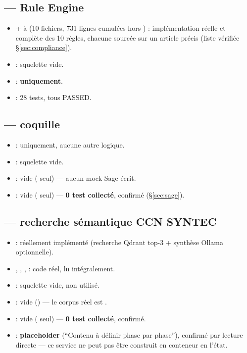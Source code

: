 \documentclass[11pt,a4paper]{article}
\begin{document}
\subsection*{ --- Rule Engine}
\begin{itemize}[leftmargin=1.3em]
\item {} +  \`a  (10 fichiers, 731 lignes cumul\'ees hors ) : impl\'ementation r\'eelle et compl\`ete des 10 r\`egles, chacune sourc\'ee sur un article pr\'ecis (liste v\'erifi\'ee \S\ref{sec:compliance}).
\item {} : squelette vide.
\item {} : \textbf{ uniquement}.
\item {} : 28 tests, tous PASSED.
\end{itemize}

\subsection*{ --- coquille}
\begin{itemize}[leftmargin=1.3em]
\item {} :  uniquement, aucune autre logique.
\item {} : squelette vide.
\item {} : vide ( seul) --- aucun mock Sage \'ecrit.
\item {} : vide ( seul) --- \textbf{0 test collect\'e}, confirm\'e (\S\ref{sec:sage}).
\end{itemize}

\subsection*{ --- recherche s\'emantique CCN SYNTEC}
\begin{itemize}[leftmargin=1.3em]
\item {} :  r\'eellement impl\'ement\'e (recherche Qdrant top-3 + synth\`ese Ollama optionnelle).
\item {}, , ,  : code r\'eel, lu int\'egralement.
\item {} : squelette vide, non utilis\'e.
\item {} : vide () --- le corpus r\'eel est .
\item {} : vide ( seul) --- \textbf{0 test collect\'e}, confirm\'e.
\item {} : \textbf{placeholder} (``Contenu \`a d\'efinir phase par phase''), confirm\'e par lecture directe --- ce service ne peut pas \^etre construit en conteneur en l'\'etat.
\end{itemize}
\end{document}
